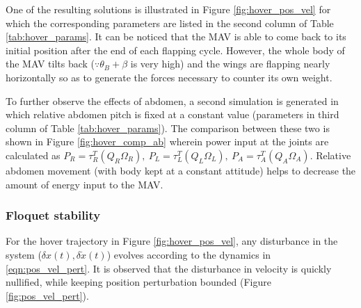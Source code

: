 \documentclass[10pt]{article}
\begin{document}
One of the resulting solutions is illustrated in Figure \ref{fig:hover_pos_vel} for which the corresponding parameters are listed in the second column of Table \ref{tab:hover_params}. It can be noticed that the MAV is able to come back to its initial position after the end of each flapping cycle. However, the whole body of the MAV tilts back ($ \because \theta_B + \beta $ is very high) and the wings are flapping nearly horizontally so as to generate the forces necessary to counter its own weight.


To further observe the effects of abdomen, a second simulation is generated in which relative abdomen pitch is fixed at a constant value (parameters in third column of Table \ref{tab:hover_params}). The comparison between these two is shown in Figure \ref{fig:hover_comp_ab} wherein power input at the joints are calculated as $ P_R = \tau_R^T (Q_R \Omega_R),\ P_L = \tau_L^T (Q_L \Omega_L),\ P_A = \tau_A^T (Q_A \Omega_A) $. Relative abdomen movement (with body kept at a constant attitude) helps to decrease the amount of energy input to the MAV.


\subsubsection{Floquet stability}
For the hover trajectory in Figure \ref{fig:hover_pos_vel}, any disturbance in the system ($ \delta x(t), \delta \dot x(t) $) evolves according to the dynamics in \eqref{eqn:pos_vel_pert}. It is observed that the disturbance in velocity is quickly nullified, while keeping position perturbation bounded (Figure \ref{fig:pos_vel_pert}).
\end{document}
